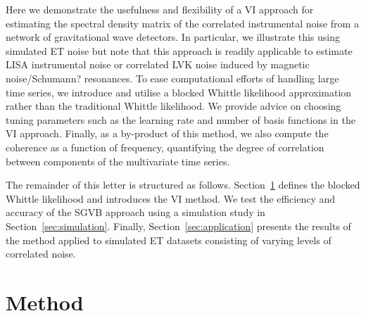 \documentclass[%
 reprint,
 amsmath,amssymb,
 aps,
]{revtex4-2}
\begin{document}
Here we demonstrate the usefulness and flexibility of a VI approach for estimating the spectral density matrix of the correlated instrumental noise from a  network of gravitational wave detectors.
In particular, we illustrate this using simulated ET noise but note that this approach is readily applicable to estimate  \ac{LISA} instrumental noise or correlated \ac{LVK} noise induced by magnetic noise/Schumann? resonances.
To ease computational efforts of handling large time series, we introduce and utilise a blocked Whittle likelihood approximation rather than the traditional Whittle likelihood. We provide advice on choosing tuning parameters such as the learning rate and number of basis functions in the VI approach. Finally,
as a by-product of this method, we also compute the coherence as a function of frequency, quantifying the degree of correlation between components of the multivariate time series. 


The remainder of this letter is structured as follows. 
Section~\ref{sec:method} defines the blocked Whittle likelihood and introduces the \ac{VI} method. 
We test the efficiency and accuracy of the SGVB approach using a simulation study in Section~\ref{sec:simulation}.
Finally, Section~\ref{sec:application} presents the results of the method applied to simulated \ac{ET} datasets consisting of varying levels of correlated noise. 








\section{Method}
\label{sec:method}
\end{document}
